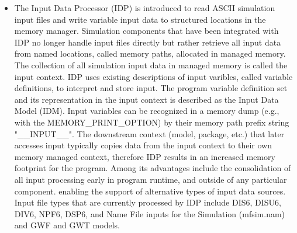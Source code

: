 \begin{itemize}
		\item The Input Data Processor (IDP) is introduced to read ASCII simulation input files and write variable input data to structured locations in the memory manager.  Simulation components that have been integrated with IDP no longer handle input files directly but rather retrieve all input data from named locations, called memory paths, allocated in managed memory.  The collection of all simulation input data in managed memory is called the input context.  IDP uses existing descriptions of input varibles, called variable definitions, to interpret and store input.  The program variable definition set and its representation in the input context is described as the Input Data Model (IDM).  Input variables can be recognized in a memory dump (e.g., with the MEMORY\_PRINT\_OPTION) by their memory path prefix string "\_\_INPUT\_\_".  The downstream context (model, package, etc.) that later accesses input typically copies data from the input context to their own memory managed context, therefore IDP results in an increased memory footprint for the program.  Among its advantages include the consolidation of all input processing early in program runtime, and outside of any particular component. enabling the support of alternative types of input data sources.  Input file types that are currently processed by IDP include DIS6, DISU6, DIV6, NPF6, DSP6, and Name File inputs for the Simulation (mfsim.nam) and GWF and GWT models.
	\end{itemize}



